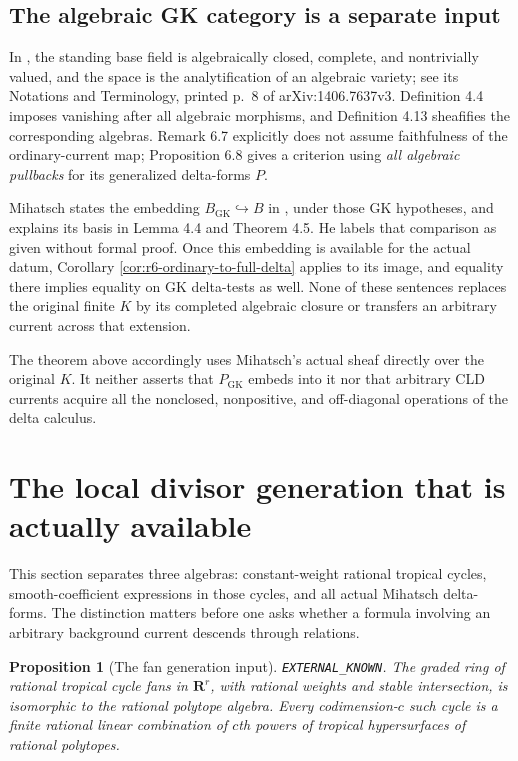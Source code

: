 \documentclass[11pt,a4paper]{article}
\numberwithin{equation}{section}
\newtheorem{proposition}[theorem]{Proposition}
\theoremstyle{definition}
\theoremstyle{remark}
\begin{document}
\subsection{The algebraic GK category is a separate input}

In \cite{GK17}, the standing base field is algebraically closed,
complete, and nontrivially valued, and the space is the analytification
of an algebraic variety; see its Notations and Terminology, printed
p.~8 of arXiv:1406.7637v3.  Definition 4.4 imposes vanishing after all
algebraic morphisms, and Definition 4.13 sheafifies the corresponding
algebras.  Remark 6.7 explicitly does not assume faithfulness of the
ordinary-current map; Proposition 6.8 gives a criterion using
\emph{all algebraic pullbacks} for its generalized delta-forms $P$.

Mihatsch states the embedding $B_{\mathrm{GK}}\hookrightarrow B$
in \cite[Section 4.2, printed p.~67]{Mih24}, under those GK hypotheses,
and explains its basis in Lemma 4.4 and Theorem 4.5.  He labels that
comparison as given without formal proof.  Once this embedding is
available for the actual datum, Corollary
\ref{cor:r6-ordinary-to-full-delta} applies to its image, and equality
there implies equality on GK delta-tests as well.  None of these
sentences replaces the original finite $K$ by its completed algebraic
closure or transfers an arbitrary current across that extension.

The theorem above accordingly uses Mihatsch's actual sheaf directly
over the original $K$.  It neither asserts that $P_{\mathrm{GK}}$
embeds into it nor that arbitrary CLD currents acquire all the
nonclosed, nonpositive, and off-diagonal operations of the delta
calculus.



\section{The local divisor generation that is actually available}
\label{sec:r6-delta-cycle-generation}

This section separates three algebras: constant-weight rational tropical
cycles, smooth-coefficient expressions in those cycles, and all actual
Mihatsch delta-forms.  The distinction matters before one asks whether a
formula involving an arbitrary background current descends through
relations.

\begin{proposition}[The fan generation input]
\label{prop:r6-fan-generation-input}
\textnormal{\texttt{EXTERNAL\_KNOWN}.}
The graded ring of rational tropical cycle fans in $\mathbf R^r$, with
rational weights and stable intersection, is isomorphic to the rational
polytope algebra.  Every codimension-$c$ such cycle is a finite rational
linear combination of $c$th powers of tropical hypersurfaces of rational
polytopes.
\end{proposition}
\end{document}
